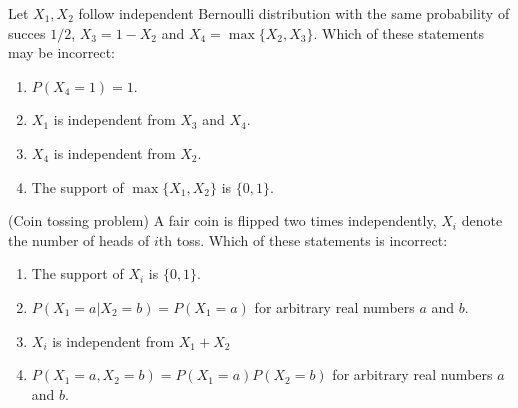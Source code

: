 \documentclass[poll_tutorial_format]{subfiles}
\begin{document}
	
	\begin{exercise}
		Let $X_1, X_2$ follow independent Bernoulli distribution with the same probability of succes $1/2$, $X_3=1-X_2$ and $X_4=\max\{X_2, X_3\}$. 
		Which of these statements may be incorrect: 
		\begin{enumerate}
			\item $P(X_4=1)=1$.
			\item $X_1$ is independent from $X_3$ and $X_4$.
			\item $X_4$ is independent from $X_2$.
			\item The support of $\max\{X_1,X_2\}$ is $\{0,1\}$.
		\end{enumerate}
	\end{exercise}
	
	
	\begin{exercise}
		(Coin tossing problem) A fair coin is flipped two times independently, $X_i$ denote the number of heads of $i$th toss. 
		Which of these statements is incorrect: 
		\begin{enumerate}
			\item The support of $X_i$ is $\{0,1\}$.
			\item $P(X_1=a|X_2=b)=P(X_1=a)$ for arbitrary real numbers $a$ and $b$.		
			\item $X_i$ is independent from $X_1+X_2$
			\item $P(X_1=a, X_2=b)=P(X_1=a)P(X_2=b)$ for arbitrary real numbers $a$ and $b$.		
		\end{enumerate}
	\end{exercise}
	 
	
	
	
	
	
	
\end{document}
